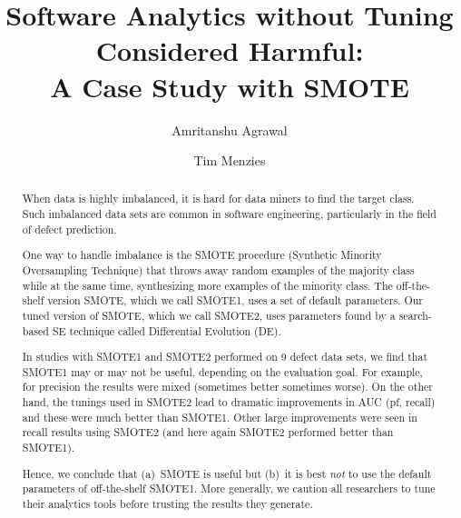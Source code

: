 \documentclass[sigconf,review, anonymous]{acmart}
\theoremstyle{break}
\theoremstyle{break}
\begin{document}

\title{Software Analytics
without Tuning Considered Harmful:\\A
Case Study with SMOTE}

\author{Amritanshu Agrawal}

\author{Tim Menzies}



\begin{abstract}
When data is highly imbalanced, it is
hard for data miners to find the target
class. Such imbalanced data sets are
common in software engineering,
particularly in the field of defect prediction.


One way to handle imbalance is the SMOTE procedure (Synthetic Minority Oversampling Technique) that 
throws away random examples of the majority
class while at the same time, synthesizing
more examples 
of the minority class.
The off-the-shelf version SMOTE,
which we call SMOTE1,
uses a set of default parameters. Our tuned version
of SMOTE, which we call SMOTE2,
uses parameters  found by a search-based SE technique
called Differential Evolution (DE). 

In studies with SMOTE1 and SMOTE2 performed on
 9 defect data sets, we find that SMOTE1 may or may not be useful, depending on the evaluation goal. For example,
 for precision the results were mixed (sometimes better sometimes worse).
On the other hand, the tunings
used in SMOTE2 lead to dramatic improvements in  AUC (pf, recall) and these were 
much better than SMOTE1. Other large improvements were seen in recall results using SMOTE2 (and here again SMOTE2 performed better than SMOTE1).

Hence, we conclude that (a)~SMOTE
is useful but (b)~it is best {\em not} to use the default parameters of off-the-shelf SMOTE1. More generally, we caution all researchers to tune their analytics tools before
trusting the results they generate.
\end{abstract}


\maketitle
\end{document}
